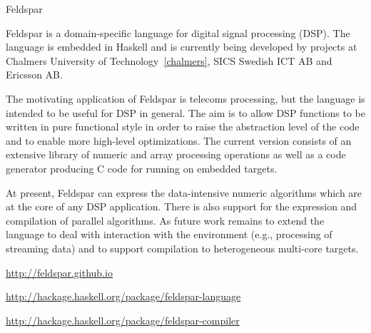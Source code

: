 \begin{hcarentry}{Feldspar}
\label{feldspar}
\makeheader

Feldspar is a domain-specific language for digital signal processing (DSP). The
language is embedded in Haskell and is currently being developed by projects at
Chalmers University of Technology~\cref{chalmers}, SICS Swedish ICT AB and
Ericsson AB.

The motivating application of Feldspar is telecoms processing, but the language
is intended to be useful for DSP in general. The aim is to allow DSP functions
to be written in pure functional style in order to raise the abstraction level of
the code and to enable more high-level optimizations. The current version consists
of an extensive library of numeric and array processing operations as well as a
code generator producing C code for running on embedded targets.

At present, Feldspar can express the data-intensive numeric algorithms which are
at the core of any DSP application. There is also support for the expression
and compilation of parallel algorithms. As future work remains to extend the language
to deal with interaction with the environment (e.g., processing of streaming data) and
to support compilation to heterogeneous multi-core targets.

\FurtherReading
\begin{compactitem}
\item \url{http://feldspar.github.io}
\item \url{http://hackage.haskell.org/package/feldspar-language}
\item \url{http://hackage.haskell.org/package/feldspar-compiler}
\end{compactitem}
\end{hcarentry}
